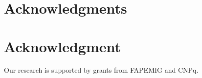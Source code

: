 \documentclass[10pt,journal,compsoc]{IEEEtran}
\begin{document}

%





\ifCLASSOPTIONcompsoc
  \section*{Acknowledgments}
\else
  \section*{Acknowledgment}
\fi


Our research is supported by grants from FAPEMIG and CNPq.
\end{document}
